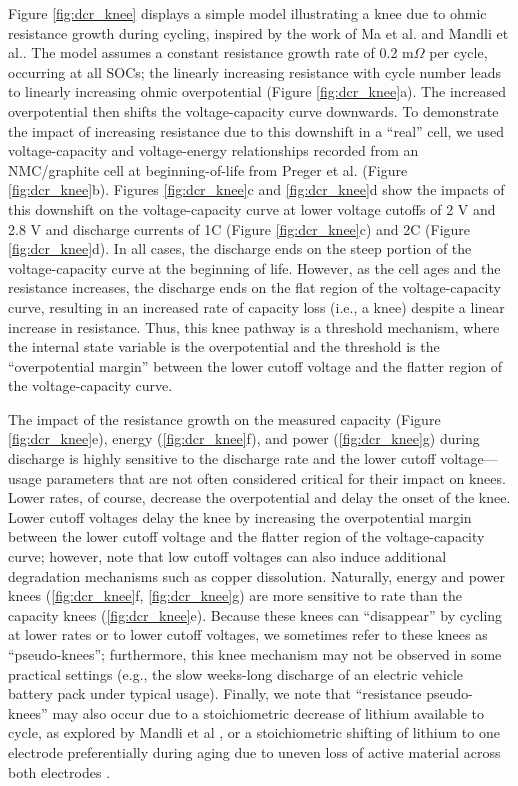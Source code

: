 \documentclass[journal=jpclcd,manuscript=article]{achemso}
\begin{document}
Figure \ref{fig:dcr_knee} displays a simple model illustrating a knee due to ohmic resistance growth during cycling, inspired by the work of Ma et al.\cite{ma_editors_2019} and Mandli et al.\cite{mandli_analysis_2019}. The model assumes a constant resistance growth rate of 0.2 m$\Omega$ per cycle, occurring at all SOCs; the linearly increasing resistance with cycle number leads to linearly increasing ohmic overpotential (Figure \ref{fig:dcr_knee}a). The increased overpotential then shifts the voltage-capacity curve downwards.
To demonstrate the impact of increasing resistance due to this downshift in a ``real'' cell, we used voltage-capacity and voltage-energy relationships recorded from an NMC/graphite cell at beginning-of-life from Preger et al.\cite{preger_degradation_2020} (Figure \ref{fig:dcr_knee}b). Figures \ref{fig:dcr_knee}c and \ref{fig:dcr_knee}d show the impacts of this downshift on the voltage-capacity curve at lower voltage cutoffs of 2 V and 2.8 V and discharge currents of 1C (Figure \ref{fig:dcr_knee}c) and 2C (Figure \ref{fig:dcr_knee}d). In all cases, the discharge ends on the steep portion of the voltage-capacity curve at the beginning of life. However, as the cell ages and the resistance increases, the discharge ends on the flat region of the voltage-capacity curve, resulting in an increased rate of capacity loss (i.e., a knee) despite a linear increase in resistance. Thus, this knee pathway is a threshold mechanism, where the internal state variable is the overpotential and the threshold is the ``overpotential margin'' between the lower cutoff voltage and the flatter region of the voltage-capacity curve.

The impact of the resistance growth on the measured capacity (Figure \ref{fig:dcr_knee}e), energy (\ref{fig:dcr_knee}f), and power (\ref{fig:dcr_knee}g) during discharge is highly sensitive to the discharge rate and the lower cutoff voltage---usage parameters that are not often considered critical for their impact on knees. Lower rates, of course, decrease the overpotential and delay the onset of the knee. Lower cutoff voltages delay the knee by increasing the overpotential margin between the lower cutoff voltage and the flatter region of the voltage-capacity curve; however, note that low cutoff voltages can also induce additional degradation mechanisms such as copper dissolution\cite{fear_elucidating_2018, carter_x-ray_2018}. Naturally, energy and power knees (\ref{fig:dcr_knee}f, \ref{fig:dcr_knee}g) are more sensitive to rate than the capacity knees (\ref{fig:dcr_knee}e). Because these knees can ``disappear'' by cycling at lower rates or to lower cutoff voltages, we sometimes refer to these knees as ``pseudo-knees''; furthermore, this knee mechanism may not be observed in some practical settings (e.g., the slow weeks-long discharge of an electric vehicle battery pack under typical usage).
Finally, we note that ``resistance pseudo-knees'' may also occur due to a stoichiometric decrease of lithium available to cycle, as explored by Mandli et al \cite{mandli_analysis_2019}, or a stoichiometric shifting of lithium to one electrode preferentially during aging due to uneven loss of active material across both electrodes \cite{lin_comprehensive_2013}.
\end{document}
